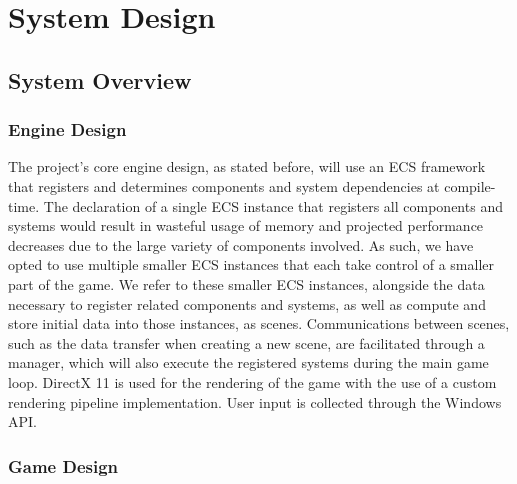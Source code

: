 \section{System Design}
\label{sec:system-design}

\subsection{System Overview}
\label{subsec:system-overview}

\subsubsection*{Engine Design}

The project's core engine design, as stated before, will use an ECS framework that registers and
determines components and system dependencies at compile-time.
The declaration of a single ECS instance that registers all components and systems would result in
wasteful usage of memory and projected performance decreases due to the large variety of components involved.
As such, we have opted to use multiple smaller ECS instances that each take control of a smaller part of the game.
We refer to these smaller ECS instances, alongside the data necessary to register related components and systems,
as well as compute and store initial data into those instances, as scenes.
Communications between scenes, such as the data transfer when creating a new scene, are facilitated through
a manager, which will also execute the registered systems during the main game loop.
DirectX 11 is used for the rendering of the game with the use of a custom rendering pipeline implementation.
User input is collected through the Windows API\@.

\subsubsection*{Game Design}

